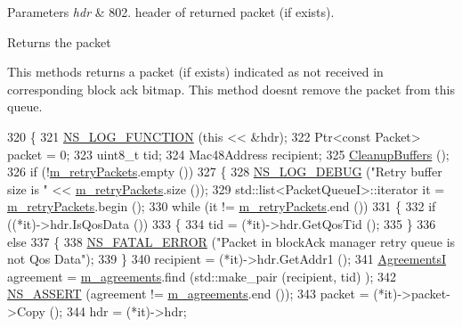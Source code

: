 \begin{DoxyParams}{Parameters}
{\em hdr} & 802. header of returned packet (if exists).\\
\hline
\end{DoxyParams}
\begin{DoxyReturn}{Returns}
the packet
\end{DoxyReturn}
This methods returns a packet (if exists) indicated as not received in corresponding block ack bitmap. This method doesn\textquotesingle{}t remove the packet from this queue. 
\begin{DoxyCode}
320 \{
321   \hyperlink{log-macros-disabled_8h_a90b90d5bad1f39cb1b64923ea94c0761}{NS\_LOG\_FUNCTION} (\textcolor{keyword}{this} << &hdr);
322   Ptr<const Packet> packet = 0;
323   uint8\_t tid;
324   Mac48Address recipient;
325   \hyperlink{classns3_1_1BlockAckManager_a27603e1b5ff9a9f5922b1056c75733e1}{CleanupBuffers} ();
326   \textcolor{keywordflow}{if} (!\hyperlink{classns3_1_1BlockAckManager_a2851f947dd68945ebc25961cff893ed9}{m\_retryPackets}.empty ())
327     \{
328       \hyperlink{group__logging_ga413f1886406d49f59a6a0a89b77b4d0a}{NS\_LOG\_DEBUG} (\textcolor{stringliteral}{"Retry buffer size is "} << \hyperlink{classns3_1_1BlockAckManager_a2851f947dd68945ebc25961cff893ed9}{m\_retryPackets}.size ());
329       std::list<PacketQueueI>::iterator it = \hyperlink{classns3_1_1BlockAckManager_a2851f947dd68945ebc25961cff893ed9}{m\_retryPackets}.begin ();
330       \textcolor{keywordflow}{while} (it != \hyperlink{classns3_1_1BlockAckManager_a2851f947dd68945ebc25961cff893ed9}{m\_retryPackets}.end ())
331         \{
332           \textcolor{keywordflow}{if} ((*it)->hdr.IsQosData ())
333             \{
334               tid = (*it)->hdr.GetQosTid ();
335             \}
336           \textcolor{keywordflow}{else}
337             \{
338               \hyperlink{group__fatal_ga5131d5e3f75d7d4cbfd706ac456fdc85}{NS\_FATAL\_ERROR} (\textcolor{stringliteral}{"Packet in blockAck manager retry queue is not Qos Data"});
339             \}
340           recipient = (*it)->hdr.GetAddr1 ();
341           \hyperlink{classns3_1_1BlockAckManager_acbd1cf7c5f3487150955c3a4c9d04102}{AgreementsI} agreement = \hyperlink{classns3_1_1BlockAckManager_a952a6b8b29705c83ba6464f7cf7ffe66}{m\_agreements}.find (std::make\_pair (recipient, tid)
      );
342           \hyperlink{assert_8h_a6dccdb0de9b252f60088ce281c49d052}{NS\_ASSERT} (agreement != \hyperlink{classns3_1_1BlockAckManager_a952a6b8b29705c83ba6464f7cf7ffe66}{m\_agreements}.end ());
343           packet = (*it)->packet->Copy ();
344           hdr = (*it)->hdr;

\end{DoxyCode}
